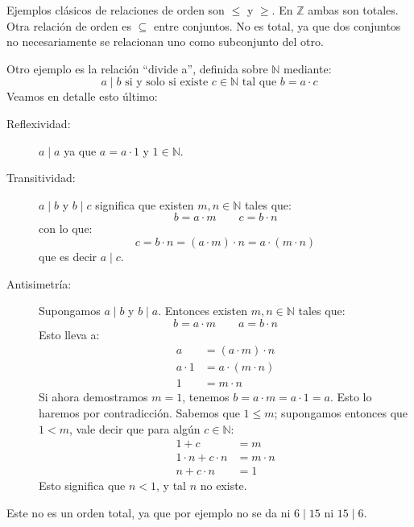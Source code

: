   Ejemplos clásicos de relaciones de orden son \(\le\) y \(\ge\).
  En \(\mathbb{Z}\) ambas son totales.
  Otra relación de orden es \(\subseteq\) entre conjuntos.
  No es total,
  ya que dos conjuntos
  no necesariamente se relacionan uno como subconjunto del otro.

  Otro ejemplo es la relación ``divide a'',
  definida sobre \(\mathbb{N}\) mediante:
  \begin{equation*}
    a \mid b
       \text{\ si y solo si existe \(c \in \mathbb{N}\) tal que\ }
	  b = a \cdot c
  \end{equation*}
  Veamos en detalle esto último:
  \begin{description}
  \item[Reflexividad:]
    \(a \mid a\) ya que \(a = a \cdot 1\)
    y \(1 \in \mathbb{N}\).
  \item[Transitividad:]
    \(a \mid b\) y \(b \mid c\)
    significa que existen \(m, n \in \mathbb{N}\)
    tales que:
    \begin{equation*}
      b = a \cdot m \qquad
      c = b \cdot n
    \end{equation*}
    con lo que:
    \begin{equation*}
      c
	= b \cdot n
	= (a \cdot m) \cdot n
	= a \cdot (m \cdot n)
    \end{equation*}
    que es decir \(a \mid c\).
  \item[Antisimetría:]
    Supongamos \(a \mid b\) y \(b \mid a\).
    Entonces existen \(m, n \in \mathbb{N}\) tales que:
    \begin{equation*}
      b = a \cdot m \qquad
      a = b \cdot n
    \end{equation*}
    Esto lleva a:
    \begin{align*}
      a
	&= (a \cdot m) \cdot n \\
      a \cdot 1
	&= a \cdot (m \cdot n) \\
      1
	&= m \cdot n
    \end{align*}
    Si ahora demostramos \(m = 1\),
    tenemos \(b = a \cdot m = a \cdot 1 = a\).
    Esto lo haremos por contradicción.
    Sabemos que \(1 \le m\);
    supongamos entonces que \(1 < m\),
    vale decir que para algún \(c \in \mathbb{N}\):
    \begin{align*}
      1 + c
	&= m \\
      1 \cdot n + c \cdot n
	&= m \cdot n \\
      n + c \cdot n
	&= 1
    \end{align*}
    Esto significa que \(n < 1\),
    y tal \(n\) no existe.
  \end{description}
  Este no es un orden total,
  ya que por ejemplo no se da ni \(6 \mid 15\) ni \(15 \mid 6\).


